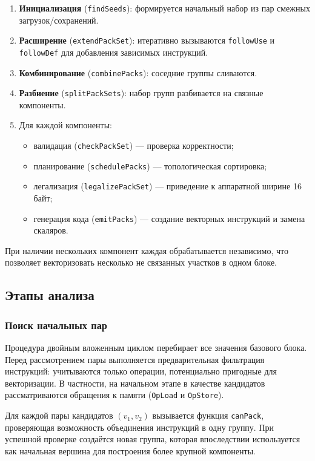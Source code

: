 \begin{enumerate}
    \item \textbf{Инициализация} (\texttt{findSeeds}): формируется начальный набор из пар смежных загрузок/сохранений.
    \item \textbf{Расширение} (\texttt{extendPackSet}): итеративно вызываются \texttt{followUse} и \texttt{followDef} для добавления зависимых инструкций.
    \item \textbf{Комбинирование} (\texttt{combinePacks}): соседние группы сливаются.
    \item \textbf{Разбиение} (\texttt{splitPackSets}): набор групп разбивается на связные компоненты.
    \item Для каждой компоненты:
        \begin{itemize}
            \item валидация (\texttt{checkPackSet}) --- проверка корректности;
            \item планирование (\texttt{schedulePacks}) --- топологическая сортировка;
            \item легализация (\texttt{legalizePackSet}) --- приведение к аппаратной ширине 16 байт;
            \item генерация кода (\texttt{emitPacks}) --- создание векторных инструкций и замена скаляров.
        \end{itemize}
\end{enumerate}

При наличии нескольких компонент каждая обрабатывается независимо, что позволяет векторизовать несколько не связанных участков в одном блоке.

\subsection{Этапы анализа}
\label{sec:analysis_stages}

\subsubsection{Поиск начальных пар}

Процедура двойным вложенным циклом перебирает все значения базового блока. 
Перед рассмотрением пары выполняется предварительная фильтрация инструкций: учитываются только операции, потенциально пригодные для векторизации. 
В частности, на начальном этапе в качестве кандидатов рассматриваются обращения к памяти (\texttt{OpLoad} и \texttt{OpStore}).

Для каждой пары кандидатов \((v_1, v_2)\) вызывается функция \texttt{canPack}, проверяющая возможность объединения инструкций в одну группу. 
При успешной проверке создаётся новая группа, которая впоследствии используется как начальная вершина для построения более крупной компоненты.

